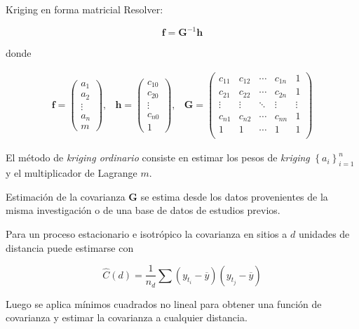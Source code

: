 \documentclass[12pts]{beamer}
\begin{document}
	\begin{frame}{Kriging en forma matricial}
		Resolver: 
		
		\begin{equation}
		\mathbf{f} = \mathbf{G}^{-1}\mathbf{h}\label{ecuacion_predictiva}
		\end{equation}
		
		\noindent donde
		
		\begin{eqnarray*}
		\mathbf{f} = \begin{pmatrix}
		a_1 \\ a_2 \\ \vdots\\ a_n \\ m
		\end{pmatrix}, & \mathbf{h} = \begin{pmatrix}
		c_{10} \\ c_{20} \\ \vdots \\ c_{n0} \\ 1
		\end{pmatrix}, & \mathbf{G} = \begin{pmatrix}
		c_{11} & c_{12} & \cdots & c_{1n} & 1\\
		c_{21} & c_{22} & \cdots & c_{2n} & 1\\
		\vdots & \vdots & \ddots & \vdots & \vdots\\
		c_{n1} & c_{n2} & \cdots & c_{nn} & 1\\
		1 & 1 & \cdots & 1 & 1\\
		\end{pmatrix}
		\end{eqnarray*}
		
		El método de \textit{kriging ordinario} consiste en estimar los pesos de \textit{kriging} $\left\lbrace a_i \right\rbrace_{i=1}^n$ y el multiplicador de Lagrange $m$.
	\end{frame}

	\begin{frame}{Estimación de la covarianza}
		$\mathbf{G}$ se estima desde los datos provenientes de la misma investigación o de una base de datos de estudios previos.
		
		Para un proceso estacionario e isotrópico la covarianza en sitios a $d$ unidades de distancia puede estimarse con
		
		\begin{equation}
		\hat{C}(d) = \frac{1}{n_d} \sum \left(y_{t_i} - \overline{y}\right) \left(y_{t_j} - \overline{y}\right)\label{estimador_covarianza}
		\end{equation}
		
		\noindent Luego se aplica mínimos cuadrados no lineal para obtener una función de covarianza y estimar la covarianza a cualquier distancia.
	\end{frame}
\end{document}
